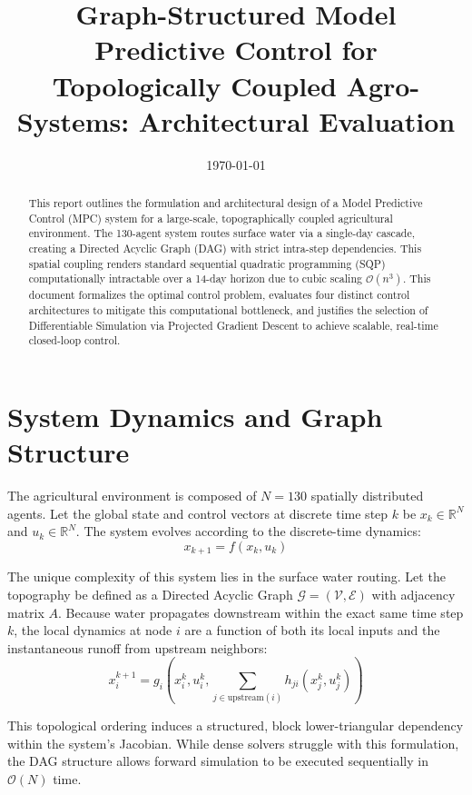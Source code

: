 \documentclass[11pt, a4paper]{article}
\title{\textbf{Graph-Structured Model Predictive Control for Topologically Coupled Agro-Systems: Architectural Evaluation}}
\author{} %
\date{\today}
\begin{document}
\maketitle

\begin{abstract}
This report outlines the formulation and architectural design of a Model Predictive Control (MPC) system for a large-scale, topographically coupled agricultural environment. The 130-agent system routes surface water via a single-day cascade, creating a Directed Acyclic Graph (DAG) with strict intra-step dependencies. This spatial coupling renders standard sequential quadratic programming (SQP) computationally intractable over a 14-day horizon due to cubic scaling $\mathcal{O}(n^3)$. This document formalizes the optimal control problem, evaluates four distinct control architectures to mitigate this computational bottleneck, and justifies the selection of Differentiable Simulation via Projected Gradient Descent to achieve scalable, real-time closed-loop control.
\end{abstract}

\section{System Dynamics and Graph Structure}
\label{sec:dynamics}
The agricultural environment is composed of $N = 130$ spatially distributed agents. Let the global state and control vectors at discrete time step $k$ be $x_k \in \mathbb{R}^N$ and $u_k \in \mathbb{R}^N$. The system evolves according to the discrete-time dynamics:
\begin{equation}
    x_{k+1} = f(x_k, u_k)
\end{equation}

The unique complexity of this system lies in the surface water routing. Let the topography be defined as a Directed Acyclic Graph $\mathcal{G} = (\mathcal{V}, \mathcal{E})$ with adjacency matrix $A$. Because water propagates downstream within the exact same time step $k$, the local dynamics at node $i$ are a function of both its local inputs and the instantaneous runoff from upstream neighbors:
\begin{equation}
    x_i^{k+1} = g_i\left(x_i^k, u_i^k, \sum_{j \in \text{upstream}(i)} h_{ji}(x_j^k, u_j^k)\right)
\end{equation}

This topological ordering induces a structured, block lower-triangular dependency within the system's Jacobian. While dense solvers struggle with this formulation, the DAG structure allows forward simulation to be executed sequentially in $\mathcal{O}(N)$ time.
\end{document}
